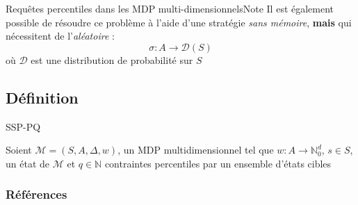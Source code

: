 \documentclass[compress]{beamer}
\begin{document}
\begin{frame}{Requêtes percentiles dans les MDP multi-dimensionnels}{Note}
Il est également possible de résoudre ce problème à l'aide d'une stratégie \textit{\color{fibeamer@orange}sans mémoire}, \alert{\textbf{mais}} qui nécessitent de l'\textit{\color{fibeamer@orange}aléatoire} :
\[
  \sigma : A \rightarrow \mathcal{D}(S)
\]
où $\mathcal{D}$ est une distribution de probabilité sur $S$

\end{frame}

\subsection{Définition}
\begin{frame}{SSP-PQ}
  \begin{definition}[SSP-PQ]
    Soient $\mathcal{M} = (S, A, \Delta, w)$, un MDP multidimensionnel tel que
    $w: A \rightarrow \mathbb{N}_0^d$, $s \in S$, un état de $\mathcal{M}$ et $q \in \mathbb{N}$
    contraintes percentiles  par un ensemble d'états cibles
  \end{definition}
\end{frame}

\begin{frame}[allowframebreaks]
        \frametitle{Références}
      \printbibliography
\end{frame}
\end{document}
